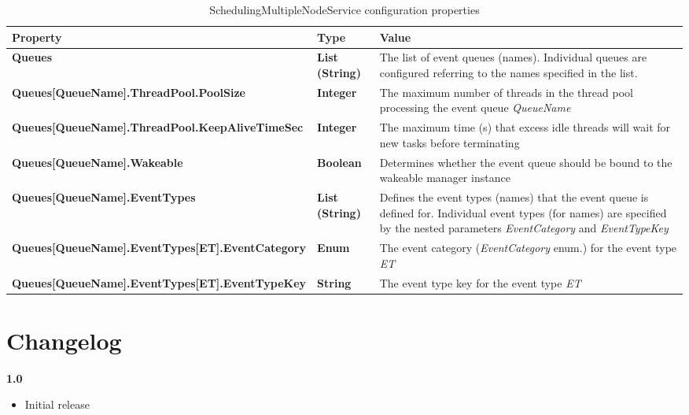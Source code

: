 \begin{table}
\scriptsize
\begin{center}
\begin{tabular}{p{6.3cm} p{0.9cm} p{7.3cm}}
	\hline
	\textbf{Property}											& \textbf{Type}						& \textbf{Value}					\\[1mm]
    \hline
	\textbf{Queues}												& \textbf{List (String)}			& The list of event queues (names). Individual queues are configured referring to the names specified in the list.		\\[1.5mm]	
	\textbf{Queues[QueueName].ThreadPool.PoolSize}				& \textbf{Integer}					& The maximum number of threads in the thread pool processing the event queue \emph{QueueName}		\\[1.5mm]	
	\textbf{Queues[QueueName].ThreadPool.KeepAliveTimeSec}		& \textbf{Integer}					& The maximum time (s) that excess idle threads will wait for new tasks before terminating			\\[1.5mm]	
	\textbf{Queues[QueueName].Wakeable}							& \textbf{Boolean}					& Determines whether the event queue should be bound to the wakeable manager instance					\\[1.5mm]	
	\textbf{Queues[QueueName].EventTypes}						& \textbf{List (String)}			& Defines the event types (names) that the event queue is defined for. Individual event types (for names) are specified by the nested parameters \emph{EventCategory} and \emph{EventTypeKey}			\\[1.5mm]	
	\textbf{Queues[QueueName].EventTypes[ET].EventCategory}		& \textbf{Enum}					& The event category (\emph{EventCategory} enum.) for the event type \emph{ET}						\\[1.5mm]	
	\textbf{Queues[QueueName].EventTypes[ET].EventTypeKey}		& \textbf{String}					& The event type key for the event type \emph{ET}						\\[1.5mm]	
    \hline
\end{tabular}
\end{center}
\caption{SchedulingMultipleNodeService configuration properties}
\label{tab:libSchedulingMultipleNodeService}
\end{table}





\chapter{Changelog}

\textbf{1.0}
\begin{itemize}
	\renewcommand{\labelitemi}{$\bullet$}
	\item Initial release
\end{itemize}

